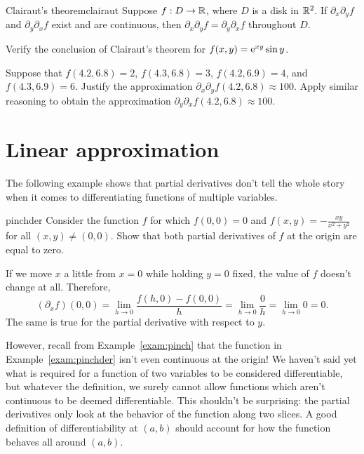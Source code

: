 \documentclass[prettycode,shellescape]{watsonbook}
\begin{document}
\begin{theo}{Clairaut's theorem}{clairaut}
  Suppose $f:D \to \mathbb{R}$, where $D$ is a disk in $\mathbb{R}^2$. If
  $\partial_x \partial_y f$ and $\partial_y \partial_x f$ exist and
  are continuous, then $\partial_x \partial_y f = \partial_y
  \partial_x f$ throughout $D$. 
\end{theo}

\begin{exercise}{}{}
  Verify the conclusion of Clairaut's theorem for $f(x,y) = \mathrm{e}^{xy}
  \sin y$. 
\end{exercise}

\begin{exercise}{}{}
  Suppose that $f(4.2,6.8) = 2$, $f(4.3,6.8) = 3$, $f(4.2,6.9) = 4$, and $f(4.3,6.9) = 6$. Justify the approximation $\partial_x \partial_y f(4.2,6.8) \approx 100$. Apply similar reasoning to obtain the approximation $\partial_y \partial_x f(4.2,6.8) \approx 100$.
\end{exercise}

\section{Linear approximation} \label{sec:linapprox} 


The following example shows that partial derivatives don't tell the
whole story when it comes to differentiating functions of multiple
variables.

\begin{example}{}{pinchder}
  Consider the function $f$ for which $f(0,0)=0$ and $f(x,y) =
  -\frac{xy}{x^2 + y^2}$ for all $(x,y) \neq (0,0)$. Show that both
  partial derivatives of $f$ at the origin are equal to zero. 
\end{example}

\begin{solution}
  If we move $x$ a little from $x=0$ while holding $y=0$ fixed, the
  value of $f$ doesn't change at all. Therefore,
  \[
    (\partial_x f)(0,0) = \lim_{h \to 0} \frac{f(h,0) - f(0,0)}{h} =
    \lim_{h \to 0} \frac{0}{h} =  \lim_{h \to 0} 0 = 0. 
  \]
  The same is true for the partial derivative with respect to $y$. 
\end{solution}

However, recall from Example~\ref{exam:pinch} that the function in
Example~\ref{exam:pinchder} isn't even continuous at the origin! We
haven't said yet what is required for a function of two variables to
be considered differentiable, but whatever the definition, we surely
cannot allow functions which aren't continuous to be deemed
differentiable. This shouldn't be surprising: the partial derivatives
only look at the behavior of the function along two slices. A good
definition of differentiability at $(a,b)$ should account for how the
function behaves all around $(a,b)$.
\end{document}

